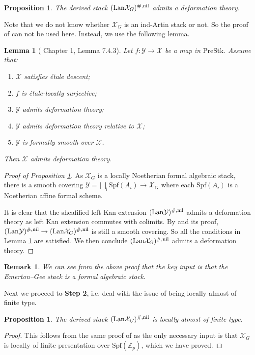 \documentclass[10pt]{article}
\newtheorem{prop}[thm]{Proposition}
\newtheorem{lem}[thm]{Lemma}
\newtheorem{rmk}[thm]{Remark}
\numberwithin{equation}{section}
\newcommand{\bZ}{{\mathbb Z}}
\newcommand{\calX}{{\mathcal X}}
\newcommand{\calY}{{\mathcal Y}}
\newcommand{\Lan}{{\mathrm{Lan}}}
\newcommand{\Spf}{{\mathrm{Spf}}}           %
\newcommand{\PreStk}{{\mathrm{PreStk}}}
\begin{document}
\begin{prop}\label{EG-def}
    The derived stack $(\Lan\calX_G)^{\#,\rm nil}$ admits a deformation theory.
\end{prop}
Note that we do not know whether $\calX_G$ is an ind-Artin stack or not. So the proof of \cite[Theorem 3.29]{Min23} can not be used here. Instead, we use the following lemma.
\begin{lem}[\cite{GR19} Chapter 1, Lemma 7.4.3]\label{def-cri}
Let $f:\calY\to \calX$ be a map in $\PreStk$. Assume that:
\begin{enumerate}
    \item $\calX$ satisfies \'etale descent;
    \item $f$ is \'etale-locally surjective;
    \item $\calY$ admits deformation theory;
    \item $\calY$ admits deformation theory relative to $\calX$;
    \item $\calY$ is formally smooth over $\calX$.
\end{enumerate}
Then $\calX$ admits deformation theory.
    
\end{lem}

\begin{proof}[Proof of Proposition \ref{EG-def}]
    As $\calX_G$ is a locally Noetherian formal algebraic stack, there is a smooth covering $\calY=\bigsqcup_i\Spf(A_i)\to \calX_G$ where each $\Spf(A_i)$ is a Noetherian affine formal scheme. 

   It is clear that the sheafified left Kan extension $(\Lan\calY)^{\#,\rm nil}$ admits a deformation theory as left Kan extension commutes with colimits. By \cite[Proposition 4.4.3]{GR19} and its proof, $(\Lan\calY)^{\#,\rm nil}\to (\Lan\calX_G)^{\#,\rm nil}$ is still a smooth covering. So all the conditions in Lemma \ref{def-cri} are satisfied. We then conclude $(\Lan\calX_G)^{\#,\rm nil}$ admits a deformation theory.
\end{proof}
\begin{rmk}
    We can see from the above proof that the key input is that the Emerton--Gee stack is a formal algebraic stack.
\end{rmk}

Next we proceed to \textbf{Step 2}, i.e. deal with the issue of being locally almost of finite type. 

\begin{prop}
    The derived stack $(\Lan\calX_G)^{\#,\rm nil}$ is locally almost of finite type.
\end{prop}
\begin{proof}
    This follows from the same proof of \cite[Proposition 3.33]{Min23} as the only necessary input is that $\calX_G$ is locally of finite presentation over $\Spf(\bZ_p)$, which we have proved.
\end{proof}
\end{document}
